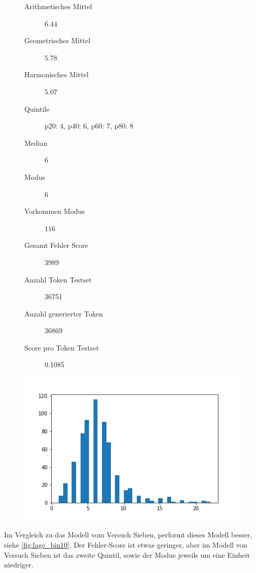 \documentclass[pdftex,a4paper,halfparskip, article]{scrartcl}
\begin{document}
\begin{figure}
\centering
\begin{minipage}{.5\textwidth}
  \centering
  \begin{description}
	\item[Arithmetisches Mittel] $6.44$	
	\item[Geometrisches Mittel] $5.78$
	\item[Harmonisches Mittel] $5.07$
	\item[Quintile] p20: $4$, p40: $6$, p60: $7$, p80: $8$
	\item[Median] $6$
	\item[Modus] $6$
	\item[Vorkommen Modus] $116$
	\item[Gesamt Fehler Score] 3989
	\item[Anzahl Token Testset] 36751 
	\item[Anzahl generierter Token] 36869
	\item[Score pro Token Testset]  0.1085
\end{description}
  \label{fig:lage_bin15}
\end{minipage}%
\begin{minipage}{.5\textwidth}
  \centering
  \includegraphics[width=1\linewidth]{predictions_bin15_histogramm}
  \label{fig:hist_bin15}
\end{minipage}
\end{figure}

Im Vergleich zu das Modell vom Versuch Sieben, performt dieses Modell besser, siehe \ref{fig:lage_bin10}. Der Fehler-Score ist etwas geringer, aber im Modell von Versuch Sieben ist das zweite Quintil, sowie der Modus jeweils um eine Einheit niedriger. 
\end{document}
